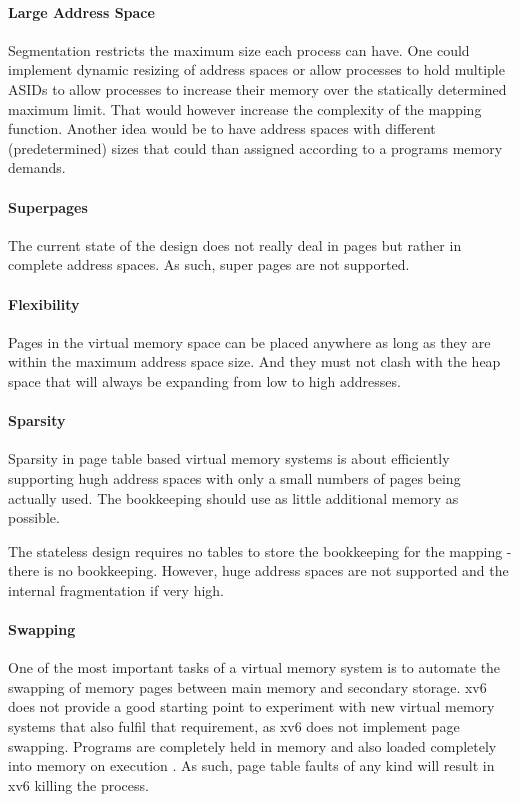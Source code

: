\paragraph{Large Address Space} Segmentation restricts the maximum size each process can have. One could implement dynamic resizing of address spaces or allow processes to hold multiple ASIDs to allow processes to increase their memory over the statically determined maximum limit.
That would however increase the complexity of the mapping function. Another idea would be to have address spaces with different (predetermined) sizes that could than assigned according to a programs memory demands.

\paragraph{Superpages} The current state of the design does not really deal in pages but rather in complete address spaces. As such, super pages are not supported.

\paragraph{Flexibility} Pages in the virtual memory space can be placed anywhere as long as they are within the maximum address space size. And they must not clash with the heap space that will always be expanding from low to high addresses.

\paragraph{Sparsity} Sparsity in page table based virtual memory systems is about efficiently
supporting hugh address spaces with only a small numbers of pages being actually used. The bookkeeping should use as little additional memory as possible.

The stateless design requires no tables to store the bookkeeping for the mapping - there is no bookkeeping. However, huge address spaces are not supported and the internal fragmentation if very high.

\paragraph{Swapping} One of the most important tasks of a virtual memory system is to automate the swapping of memory pages between main memory and secondary storage. xv6 does not provide a good starting point to experiment with new virtual memory systems that also fulfil that requirement, as xv6 does not implement page swapping. Programs are completely held in memory and also loaded completely into memory on execution \cite{cox2011xv6}. As such, page table faults of any kind will result in xv6 killing the process.

